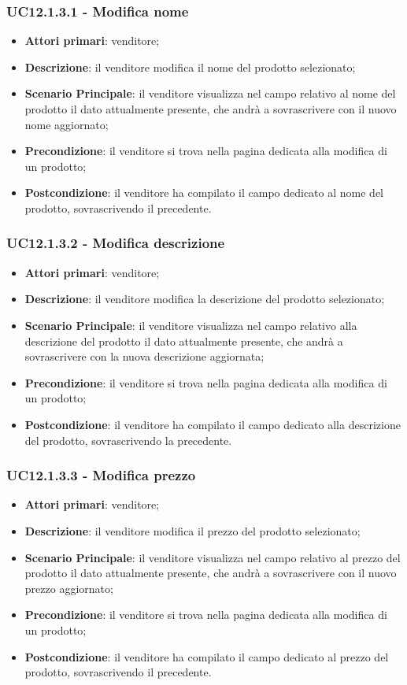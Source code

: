 \subsubsection{UC12.1.3.1 - Modifica nome}
\begin{itemize}
\item \textbf{Attori primari}: venditore;
\item \textbf{Descrizione}: il venditore modifica il nome del prodotto selezionato;
\item \textbf{Scenario Principale}: il venditore visualizza nel campo relativo al nome del prodotto il dato attualmente presente, che andrà a sovrascrivere con il nuovo nome aggiornato;
\item \textbf{Precondizione}: il venditore si trova nella pagina dedicata alla modifica di un prodotto;
\item \textbf{Postcondizione}: il venditore ha compilato il campo dedicato al nome del prodotto, sovrascrivendo il precedente.
\end{itemize}

\subsubsection{UC12.1.3.2 - Modifica descrizione}
\begin{itemize}
\item \textbf{Attori primari}: venditore;
\item \textbf{Descrizione}: il venditore modifica la descrizione del prodotto selezionato;
\item \textbf{Scenario Principale}: il venditore visualizza nel campo relativo alla descrizione del prodotto il dato attualmente presente, che andrà a sovrascrivere con la nuova descrizione aggiornata;
\item \textbf{Precondizione}: il venditore si trova nella pagina dedicata alla modifica di un prodotto;
\item \textbf{Postcondizione}: il venditore ha compilato il campo dedicato alla descrizione del prodotto, sovrascrivendo la precedente.
\end{itemize}

\subsubsection{UC12.1.3.3 - Modifica prezzo}
\begin{itemize}
\item \textbf{Attori primari}: venditore;
\item \textbf{Descrizione}: il venditore modifica il prezzo del prodotto selezionato;
\item \textbf{Scenario Principale}: il venditore visualizza nel campo relativo al prezzo del prodotto il dato attualmente presente, che andrà a sovrascrivere con il nuovo prezzo aggiornato;
\item \textbf{Precondizione}: il venditore si trova nella pagina dedicata alla modifica di un prodotto;
\item \textbf{Postcondizione}: il venditore ha compilato il campo dedicato al prezzo del prodotto, sovrascrivendo il precedente.
\end{itemize}

